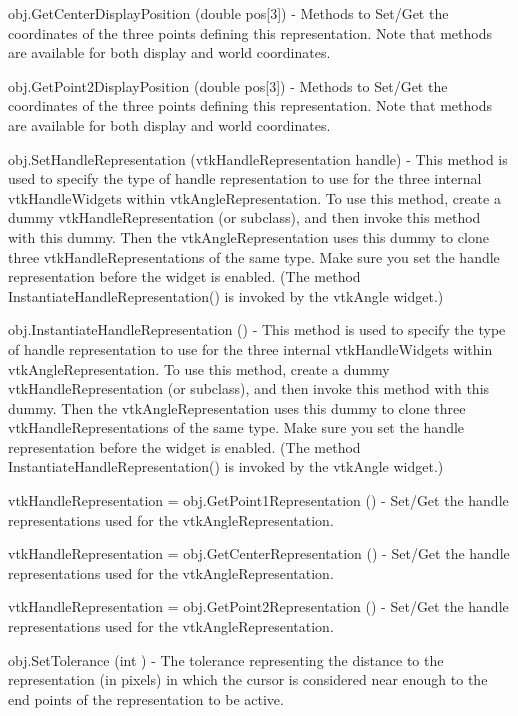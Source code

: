 \begin{DoxyItemize}
\item {\ttfamily obj.\-Get\-Center\-Display\-Position (double pos\mbox{[}3\mbox{]})} -\/ Methods to Set/\-Get the coordinates of the three points defining this representation. Note that methods are available for both display and world coordinates.  
\item {\ttfamily obj.\-Get\-Point2\-Display\-Position (double pos\mbox{[}3\mbox{]})} -\/ Methods to Set/\-Get the coordinates of the three points defining this representation. Note that methods are available for both display and world coordinates.  
\item {\ttfamily obj.\-Set\-Handle\-Representation (vtk\-Handle\-Representation handle)} -\/ This method is used to specify the type of handle representation to use for the three internal vtk\-Handle\-Widgets within vtk\-Angle\-Representation. To use this method, create a dummy vtk\-Handle\-Representation (or subclass), and then invoke this method with this dummy. Then the vtk\-Angle\-Representation uses this dummy to clone three vtk\-Handle\-Representations of the same type. Make sure you set the handle representation before the widget is enabled. (The method Instantiate\-Handle\-Representation() is invoked by the vtk\-Angle widget.)  
\item {\ttfamily obj.\-Instantiate\-Handle\-Representation ()} -\/ This method is used to specify the type of handle representation to use for the three internal vtk\-Handle\-Widgets within vtk\-Angle\-Representation. To use this method, create a dummy vtk\-Handle\-Representation (or subclass), and then invoke this method with this dummy. Then the vtk\-Angle\-Representation uses this dummy to clone three vtk\-Handle\-Representations of the same type. Make sure you set the handle representation before the widget is enabled. (The method Instantiate\-Handle\-Representation() is invoked by the vtk\-Angle widget.)  
\item {\ttfamily vtk\-Handle\-Representation = obj.\-Get\-Point1\-Representation ()} -\/ Set/\-Get the handle representations used for the vtk\-Angle\-Representation.  
\item {\ttfamily vtk\-Handle\-Representation = obj.\-Get\-Center\-Representation ()} -\/ Set/\-Get the handle representations used for the vtk\-Angle\-Representation.  
\item {\ttfamily vtk\-Handle\-Representation = obj.\-Get\-Point2\-Representation ()} -\/ Set/\-Get the handle representations used for the vtk\-Angle\-Representation.  
\item {\ttfamily obj.\-Set\-Tolerance (int )} -\/ The tolerance representing the distance to the representation (in pixels) in which the cursor is considered near enough to the end points of the representation to be active.  

\end{DoxyItemize}
